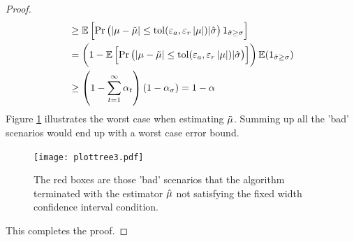 \documentclass{iitthesis}
\theoremstyle{definition}
\begin{document}
\begin{proof}
\begin{align}
& \geq \mathbb{E}\left[\Pr\left (\left \lvert \mu-\tilde{\mu} \right \rvert \leq \operatorname{tol}(\varepsilon_a, \varepsilon_r \left \lvert \mu \right \rvert) |\hat{\sigma}\right)1_{\hat{\sigma} \geq \sigma}\right]\\
& = \left(1-\mathbb{E}\left[\Pr\left (\left \lvert \mu-\tilde{\mu} \right \rvert \leq \operatorname{tol}(\varepsilon_a, \varepsilon_r \left \lvert \mu \right \rvert) |\hat{\sigma}\right)\right]\right) \mathbb{E}(1_{\hat{\sigma} \geq \sigma})\\
& \geq \left(1-\sum_{t=1}^\infty \alpha_t\right)(1-\alpha_\sigma) = 1-\alpha
\end{align}
Figure \ref{WorstcasemeanMCgproof} illustrates the worst case when estimating $\tilde{\mu}$. Summing up all the 'bad' scenarios would end up with a worst case error bound. 
\begin{figure} 
\centering
\texttt{[image: plottree3.pdf]} 
\caption{The red boxes are those 'bad' scenarios that the algorithm terminated with the estimator $\hat{\mu}$ not satisfying the fixed width confidence interval condition.\label{WorstcasemeanMCgproof}}
\end{figure}
This completes the proof.


\end{proof}
\end{document}

